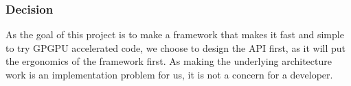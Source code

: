 %
%

\subsubsection{Decision}
As the goal of this project is to make a framework that makes it fast and simple to try GPGPU accelerated code, we choose to design the API first, as it will put the ergonomics of the framework first. As making the underlying architecture work is an implementation problem for us, it is not a concern for a developer.